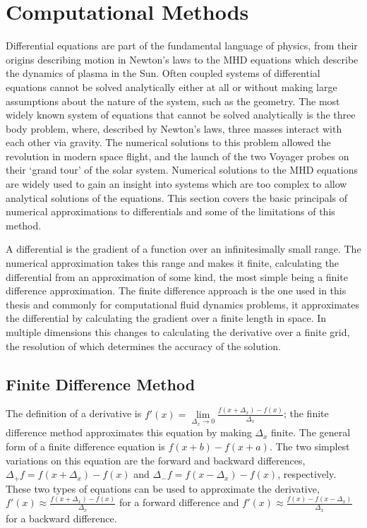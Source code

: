 \section{Computational Methods}\label{sec:numericalmethods}
Differential equations are part of the fundamental language of physics, from their origins describing motion in Newton's laws to the MHD equations which describe the dynamics of plasma in the Sun. 
Often coupled systems of differential equations cannot be solved analytically either at all or without making large assumptions about the nature of the system, such as the geometry.
The most widely known system of equations that cannot be solved analytically is the three body problem, where, described by Newton's laws, three masses interact with each other via gravity.
The numerical solutions to this problem allowed the revolution in modern space flight, and the launch of the two Voyager probes on their `grand tour' of the solar system.
Numerical solutions to the MHD equations are widely used to gain an insight into systems which are too complex to allow analytical solutions of the equations.
This section covers the basic principals of numerical approximations to differentials and some of the limitations of this method.

A differential is the gradient of a function over an infinitesimally small range.
The numerical approximation takes this range and makes it finite, calculating the differential from an approximation of some kind, the most simple being a finite difference approximation.
The finite difference approach is the one used in this thesis and commonly for computational fluid dynamics problems, it approximates the differential by calculating the gradient over a finite length in space.
In multiple dimensions this changes to calculating the derivative over a finite grid, the resolution of which determines the accuracy of the solution.




\subsection{Finite Difference Method}

The definition of a derivative is $f'(x)=\lim\limits _{\Delta_{x}\to0}\frac{f(x+\Delta_{x})-f(x)}{\Delta_{x}}$; the finite difference method approximates this equation by making $\Delta_{x}$ finite.
The general form of a finite difference equation is $f(x+b)-f(x+a)$. The two simplest variations on this equation are the forward and backward differences, $\Delta_{+}f=f(x+\Delta_x)-f(x)$ and $\Delta_{-}f=f(x-\Delta_x)-f(x)$, respectively.
These two types of equations can be used to approximate the derivative, $f'(x)\approx\frac{f(x+\Delta_{x})-f(x)}{\Delta_{x}}$ for a forward difference and $f'(x)\approx\frac{f(x)-f(x-\Delta_{x})}{\Delta_{x}}$ for a backward difference.

